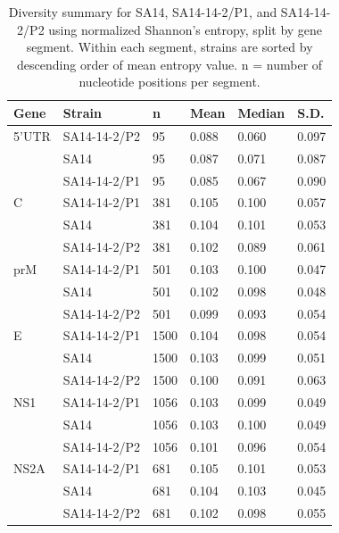 \begin{longtabu}{X[l]X[1.5,l]X[l]X[l]X[l]X[l]}
	\caption[Diversity summary for SA14, SA14-14-2/P1, and SA14-14-2/P2 using normalized Shannon's entropy,
	split by gene segment.]{Diversity summary for SA14, SA14-14-2/P1, and SA14-14-2/P2 using normalized Shannon's entropy,
	split by gene segment. Within each segment, strains are sorted by descending order of mean entropy value. n = number of nucleotide positions per segment.\label{JEV_entropy_genewise}}\\
	\rowfont[1]{\bfseries}
\toprule
Gene  & Strain       & n    & Mean  & Median & S.D.  \\ 'UTR & SA14-14-2/P2 & 95   & 0.088 & 0.060  & 0.097 \\
& SA14         & 95   & 0.087 & 0.071  & 0.087 \\
& SA14-14-2/P1 & 95   & 0.085 & 0.067  & 0.090 \\ \midrule
C     & SA14-14-2/P1 & 381  & 0.105 & 0.100  & 0.057 \\
& SA14         & 381  & 0.104 & 0.101  & 0.053 \\
& SA14-14-2/P2 & 381  & 0.102 & 0.089  & 0.061 \\ \midrule
prM   & SA14-14-2/P1 & 501  & 0.103 & 0.100  & 0.047 \\
& SA14         & 501  & 0.102 & 0.098  & 0.048 \\
& SA14-14-2/P2 & 501  & 0.099 & 0.093  & 0.054 \\ \midrule
E     & SA14-14-2/P1 & 1500 & 0.104 & 0.098  & 0.054 \\
& SA14         & 1500 & 0.103 & 0.099  & 0.051 \\
& SA14-14-2/P2 & 1500 & 0.100 & 0.091  & 0.063 \\ \midrule
NS1   & SA14-14-2/P1 & 1056 & 0.103 & 0.099  & 0.049 \\
& SA14         & 1056 & 0.103 & 0.100  & 0.049 \\
& SA14-14-2/P2 & 1056 & 0.101 & 0.096  & 0.054 \\ \midrule
NS2A  & SA14-14-2/P1 & 681  & 0.105 & 0.101  & 0.053 \\
& SA14         & 681  & 0.104 & 0.103  & 0.045 \\
& SA14-14-2/P2 & 681  & 0.102 & 0.098  & 0.055 \\ \midrule

\end{longtabu}
